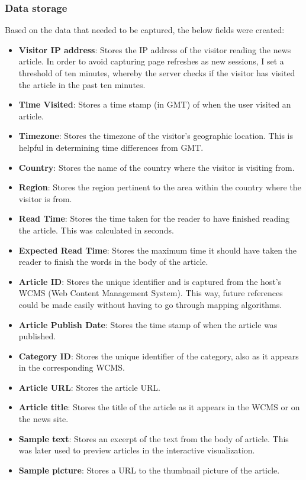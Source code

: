 \documentclass[12pt]{article}
\begin{document}
\vfill

\subsubsection{Data storage}

Based on the data that needed to be captured, the below fields were created:
\begin{itemize}
\item \textbf{Visitor IP address}: Stores the IP address of the visitor reading the news article. In order to avoid capturing page refreshes as new sessions, I set a threshold of ten minutes, whereby the server checks if the visitor has visited the article in the past ten minutes.
\item \textbf{Time Visited}: Stores a time stamp (in GMT) of when the user visited an article.
\item \textbf{Timezone}: Stores the timezone of the visitor's geographic location. This is helpful in determining time differences from GMT.
\item \textbf{Country}: Stores the name of the country where the visitor is visiting from.
\item \textbf{Region}: Stores the region pertinent to the area within the country where the visitor is from.
\item \textbf{Read Time}: Stores the time taken for the reader to have finished reading the article. This was calculated in seconds.
\item \textbf{Expected Read Time}: Stores the maximum time it should have taken the reader to finish the words in the body of the article.
\item \textbf{Article ID}: Stores the unique identifier and is captured from the host's WCMS (Web Content Management System). This way, future references could be made easily without having to go through mapping algorithms.
\item \textbf{Article Publish Date}: Stores the time stamp of when the article was published.
\item \textbf{Category ID}: Stores the unique identifier of the category, also as it appears in the corresponding WCMS.
\item \textbf{Article URL}: Stores the article URL. 
\item \textbf{Article title}: Stores the title of the article as it appears in the WCMS or on the news site.
\item \textbf{Sample text}: Stores an excerpt of the text from the body of article. This was later used to preview articles in the interactive visualization. 
\item \textbf{Sample picture}: Stores a URL to the thumbnail picture of the article.

\end{itemize}
\end{document}

